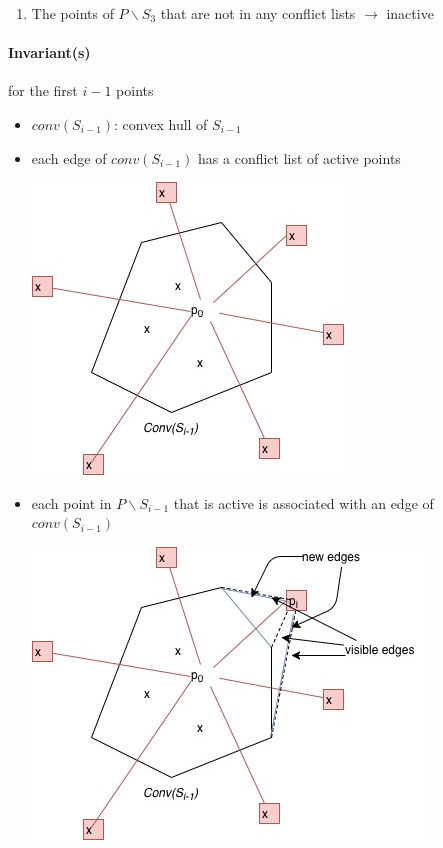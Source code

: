 \begin{enumerate}
\begin{center}
\end{center}
\item The points of $P \backslash S_3$ that are not in any conflict lists $\rightarrow$ inactive
\end{enumerate}
\paragraph{Invariant(s)} for the first $i-1$ points 
\begin{itemize}
	\item $conv(S_{i-1})$: convex hull of $S_{i-1}$
	\item each edge of $conv(S_{i-1})$ has a conflict list of active points
	\begin{center}
		\includegraphics[scale=0.5]{img/convex7} 
	\end{center}
	\item each point in $P \backslash S_{i-1}$  that is active is associated with an edge of $conv(S_{i-1})$
		\begin{center}
		\includegraphics[scale=0.5]{img/convex8} 
	\end{center}
\end{itemize}
